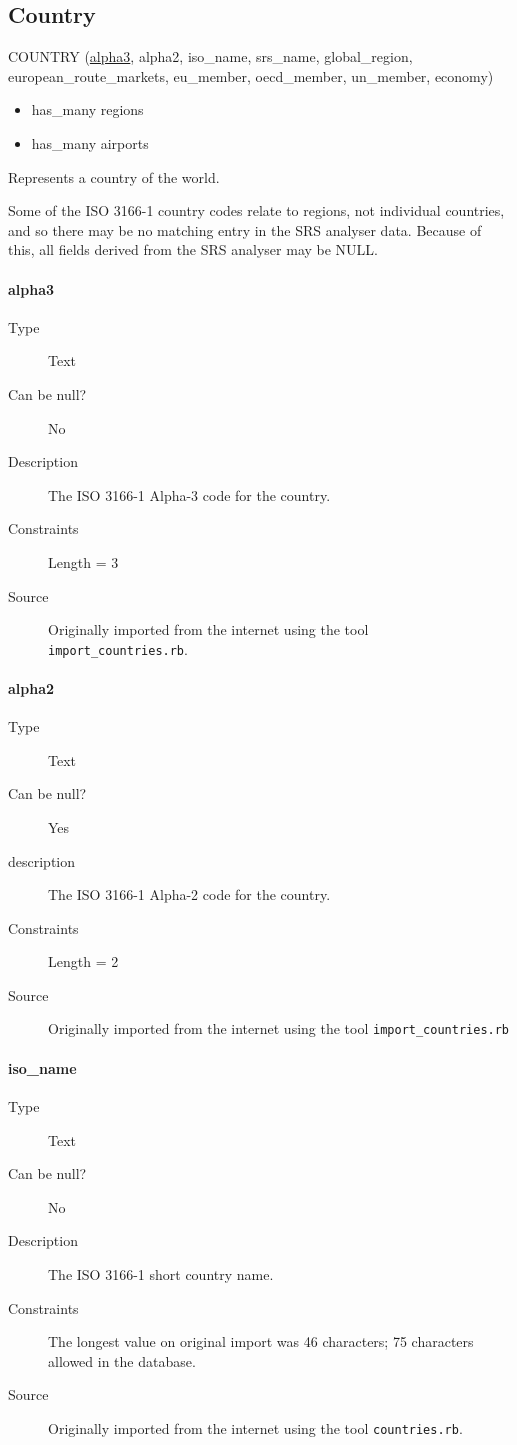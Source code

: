 \documentclass[]{report}
\begin{document}
\subsection{Country}
COUNTRY (\underline{alpha3}, alpha2, iso\_name, srs\_name, global\_region, european\_route\_markets, eu\_member, oecd\_member, un\_member, economy)
\begin{itemize}
\item has\_many regions
\item has\_many airports
\end{itemize}
Represents a country of the world. 

Some of the ISO 3166-1 country codes relate to regions, not individual countries, and so there may be no matching entry in the SRS analyser data. Because of this, all fields derived from the SRS analyser may be NULL.
\paragraph{alpha3} 
	\begin{description}
	\item[Type]Text
	\item[Can be null?]No
	\item[Description]The ISO 3166-1 Alpha-3 code for the country.
	\item[Constraints]Length = 3
	\item[Source]Originally imported from the internet using the tool \texttt{import\_countries.rb}.
\end{description}
\paragraph{alpha2}
	\begin{description}
	\item[Type] Text
	\item[Can be null?] Yes
	\item[description] The ISO 3166-1 Alpha-2 code for the country.
	\item[Constraints] Length = 2
	\item[Source] Originally imported from the internet using the tool \texttt{import\_countries.rb}
	\end{description}
\paragraph{iso\_name}
	\begin{description}
	\item[Type]Text
	\item[Can be null?]No
	\item[Description]The ISO 3166-1 short country name. 
	\item[Constraints]The longest value on original import was 46 characters; 75 characters allowed in the database.
	\item[Source]Originally imported from the internet using the tool \texttt{countries.rb}.
	\end{description}
\end{document}
